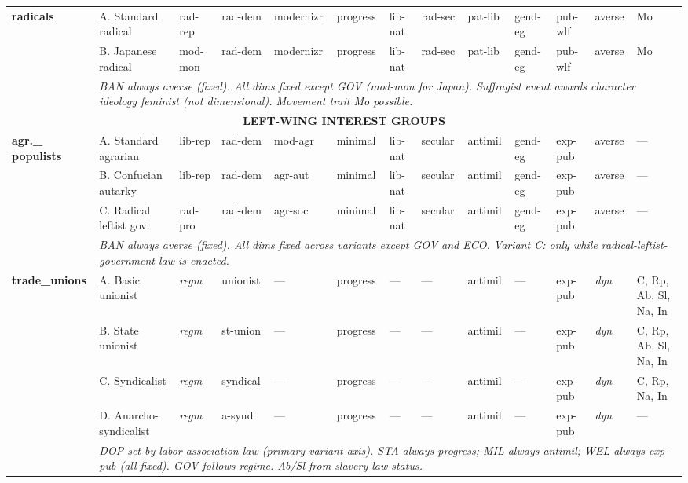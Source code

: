 \documentclass[a4paper]{article}
\newcommand{\nd}{---}
\newcommand{\reg}{\textit{regm}}
\newcommand{\minorrow}[2]{\rowcolor{minorRow} #1 & \multicolumn{12}{p{22cm}|}{\textit{#2}} \\}
\begin{document}
\begin{footnotesize}
\begin{longtable}{|p{1.8cm}|p{2.3cm}|p{1.55cm}|p{1.65cm}|p{1.65cm}|p{1.3cm}|p{1.5cm}|p{1.5cm}|p{1.5cm}|p{1.3cm}|p{1.45cm}|p{1.0cm}|p{2.65cm}|}
\multirow{3}{*}{\cellcolor{centerHdr}\textbf{radicals}} &
  A. Standard radical & rad-rep & rad-dem & modernizr & progress & lib-nat & rad-sec & pat-lib & gend-eg & pub-wlf & averse & Mo \\ \cline{2-13}
\cellcolor{centerHdr} &
  B. Japanese radical & mod-mon & rad-dem & modernizr & progress & lib-nat & rad-sec & pat-lib & gend-eg & pub-wlf & averse & Mo \\ \cline{2-13}
\minorrow{\cellcolor{centerHdr}}{BAN always averse (fixed). All dims fixed except GOV (mod-mon for Japan). Suffragist event awards character ideology feminist (not dimensional). Movement trait Mo possible.}
\hline

\multicolumn{13}{|c|}{\cellcolor{grpRow}\bfseries LEFT-WING INTEREST GROUPS} \\
\hline

\multirow{4}{*}{\cellcolor{leftHdr}\textbf{agr.\_ populists}} &
  A. Standard agrarian & lib-rep & rad-dem & mod-agr & minimal & lib-nat & secular & antimil & gend-eg & exp-pub & averse & \nd \\ \cline{2-13}
\cellcolor{leftHdr} &
  B. Confucian autarky & lib-rep & rad-dem & agr-aut & minimal & lib-nat & secular & antimil & gend-eg & exp-pub & averse & \nd \\ \cline{2-13}
\cellcolor{leftHdr} &
  C. Radical leftist gov. & rad-pro & rad-dem & agr-soc & minimal & lib-nat & secular & antimil & gend-eg & exp-pub & averse & \nd \\ \cline{2-13}
\minorrow{\cellcolor{leftHdr}}{BAN always averse (fixed). All dims fixed across variants except GOV and ECO. Variant C: only while radical-leftist-government law is enacted.}
\hline

\multirow{5}{*}{\cellcolor{leftHdr}\textbf{trade\_unions}} &
  A. Basic unionist & \reg & unionist & \nd & progress & \nd & \nd & antimil & \nd & exp-pub & \textit{dyn} & C, Rp, Ab, Sl, Na, In \\ \cline{2-13}
\cellcolor{leftHdr} &
  B. State unionist & \reg & st-union & \nd & progress & \nd & \nd & antimil & \nd & exp-pub & \textit{dyn} & C, Rp, Ab, Sl, Na, In \\ \cline{2-13}
\cellcolor{leftHdr} &
  C. Syndicalist & \reg & syndical & \nd & progress & \nd & \nd & antimil & \nd & exp-pub & \textit{dyn} & C, Rp, Na, In \\ \cline{2-13}
\cellcolor{leftHdr} &
  D. Anarcho-syndicalist & \reg & a-synd & \nd & progress & \nd & \nd & antimil & \nd & exp-pub & \textit{dyn} & \nd \\ \cline{2-13}
\minorrow{\cellcolor{leftHdr}}{DOP set by labor association law (primary variant axis). STA always progress; MIL always antimil; WEL always exp-pub (all fixed). GOV follows regime. Ab/Sl from slavery law status.}
\hline


\end{longtable}
\end{footnotesize}
\end{document}
